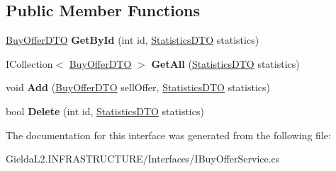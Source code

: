 \subsection*{Public Member Functions}
\begin{DoxyCompactItemize}
\item 
\mbox{\label{interface_gielda_l2_1_1_i_n_f_r_a_s_t_r_u_c_t_u_r_e_1_1_interfaces_1_1_i_buy_offer_service_a0ab6338a88cfb51de2e0baabf004d4a7}} 
\mbox{\hyperlink{class_gielda_l2_1_1_i_n_f_r_a_s_t_r_u_c_t_u_r_e_1_1_d_t_o_1_1_buy_offer_d_t_o}{Buy\+Offer\+D\+TO}} {\bfseries Get\+By\+Id} (int id, \mbox{\hyperlink{class_gielda_l2_1_1_i_n_f_r_a_s_t_r_u_c_t_u_r_e_1_1_d_t_o_1_1_statistics_d_t_o}{Statistics\+D\+TO}} statistics)
\item 
\mbox{\label{interface_gielda_l2_1_1_i_n_f_r_a_s_t_r_u_c_t_u_r_e_1_1_interfaces_1_1_i_buy_offer_service_af6e997464bddb462ac46c3e5b1452d99}} 
I\+Collection$<$ \mbox{\hyperlink{class_gielda_l2_1_1_i_n_f_r_a_s_t_r_u_c_t_u_r_e_1_1_d_t_o_1_1_buy_offer_d_t_o}{Buy\+Offer\+D\+TO}} $>$ {\bfseries Get\+All} (\mbox{\hyperlink{class_gielda_l2_1_1_i_n_f_r_a_s_t_r_u_c_t_u_r_e_1_1_d_t_o_1_1_statistics_d_t_o}{Statistics\+D\+TO}} statistics)
\item 
\mbox{\label{interface_gielda_l2_1_1_i_n_f_r_a_s_t_r_u_c_t_u_r_e_1_1_interfaces_1_1_i_buy_offer_service_a9126d0486d320b2910a9e0194cd7359c}} 
void {\bfseries Add} (\mbox{\hyperlink{class_gielda_l2_1_1_i_n_f_r_a_s_t_r_u_c_t_u_r_e_1_1_d_t_o_1_1_buy_offer_d_t_o}{Buy\+Offer\+D\+TO}} sell\+Offer, \mbox{\hyperlink{class_gielda_l2_1_1_i_n_f_r_a_s_t_r_u_c_t_u_r_e_1_1_d_t_o_1_1_statistics_d_t_o}{Statistics\+D\+TO}} statistics)
\item 
\mbox{\label{interface_gielda_l2_1_1_i_n_f_r_a_s_t_r_u_c_t_u_r_e_1_1_interfaces_1_1_i_buy_offer_service_ae6ae3e4bd6aa7dfe0efd21c52b7c3e0c}} 
bool {\bfseries Delete} (int id, \mbox{\hyperlink{class_gielda_l2_1_1_i_n_f_r_a_s_t_r_u_c_t_u_r_e_1_1_d_t_o_1_1_statistics_d_t_o}{Statistics\+D\+TO}} statistics)
\end{DoxyCompactItemize}


The documentation for this interface was generated from the following file\+:\begin{DoxyCompactItemize}
\item 
Gielda\+L2.\+I\+N\+F\+R\+A\+S\+T\+R\+U\+C\+T\+U\+R\+E/\+Interfaces/I\+Buy\+Offer\+Service.\+cs\end{DoxyCompactItemize}
